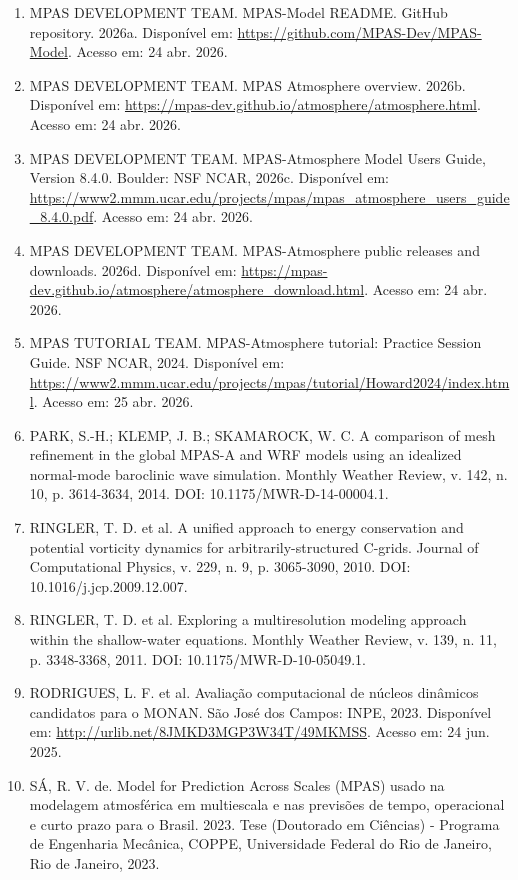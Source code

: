 \documentclass[12pt,a4paper,oneside]{book}
\begin{document}
\begin{enumerate}
\item
  MPAS DEVELOPMENT TEAM. MPAS-Model README. GitHub repository. 2026a. Disponível em: \url{https://github.com/MPAS-Dev/MPAS-Model}. Acesso em: 24 abr. 2026.
\item
  MPAS DEVELOPMENT TEAM. MPAS Atmosphere overview. 2026b. Disponível em: \url{https://mpas-dev.github.io/atmosphere/atmosphere.html}. Acesso em: 24 abr. 2026.
\item
  MPAS DEVELOPMENT TEAM. MPAS-Atmosphere Model User\textquotesingle s Guide, Version 8.4.0. Boulder: NSF NCAR, 2026c. Disponível em: \url{https://www2.mmm.ucar.edu/projects/mpas/mpas_atmosphere_users_guide_8.4.0.pdf}. Acesso em: 24 abr. 2026.
\item
  MPAS DEVELOPMENT TEAM. MPAS-Atmosphere public releases and downloads. 2026d. Disponível em: \url{https://mpas-dev.github.io/atmosphere/atmosphere_download.html}. Acesso em: 24 abr. 2026.
\item
  MPAS TUTORIAL TEAM. MPAS-Atmosphere tutorial: Practice Session Guide. NSF NCAR, 2024. Disponível em: \url{https://www2.mmm.ucar.edu/projects/mpas/tutorial/Howard2024/index.html}. Acesso em: 25 abr. 2026.
\item
  PARK, S.-H.; KLEMP, J. B.; SKAMAROCK, W. C. A comparison of mesh refinement in the global MPAS-A and WRF models using an idealized normal-mode baroclinic wave simulation. Monthly Weather Review, v. 142, n. 10, p. 3614-3634, 2014. DOI: 10.1175/MWR-D-14-00004.1.
\item
  RINGLER, T. D. et al. A unified approach to energy conservation and potential vorticity dynamics for arbitrarily-structured C-grids. Journal of Computational Physics, v. 229, n. 9, p. 3065-3090, 2010. DOI: 10.1016/j.jcp.2009.12.007.
\item
  RINGLER, T. D. et al. Exploring a multiresolution modeling approach within the shallow-water equations. Monthly Weather Review, v. 139, n. 11, p. 3348-3368, 2011. DOI: 10.1175/MWR-D-10-05049.1.
\item
  RODRIGUES, L. F. et al. Avaliação computacional de núcleos dinâmicos candidatos para o MONAN. São José dos Campos: INPE, 2023. Disponível em: \url{http://urlib.net/8JMKD3MGP3W34T/49MKMSS}. Acesso em: 24 jun. 2025.
\item
  SÁ, R. V. de. Model for Prediction Across Scales (MPAS) usado na modelagem atmosférica em multiescala e nas previsões de tempo, operacional e curto prazo para o Brasil. 2023. Tese (Doutorado em Ciências) - Programa de Engenharia Mecânica, COPPE, Universidade Federal do Rio de Janeiro, Rio de Janeiro, 2023.

\end{enumerate}
\end{document}
